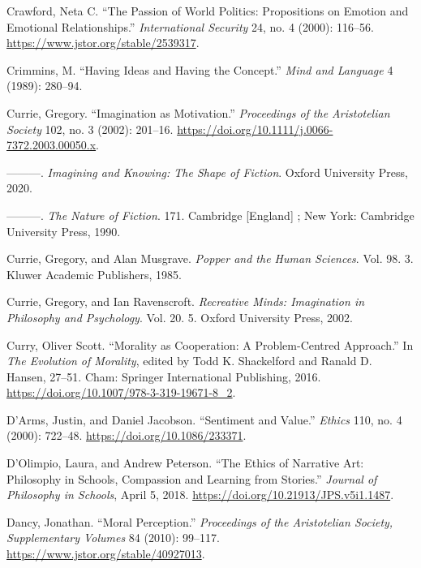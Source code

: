 \documentclass[phdthesis,12pt,final]{wuthesis}
\newlength{\cslhangindent}
\newenvironment{CSLReferences}[2] %
{\begin{list}{}{%
	\setlength{\itemindent}{0pt}
	\setlength{\leftmargin}{0pt}
	\setlength{\parsep}{0pt}
	\ifodd #1
	\setlength{\leftmargin}{\cslhangindent}
	\setlength{\itemindent}{-1\cslhangindent}
	\fi
	\setlength{\itemsep}{#2\baselineskip}}}
{\end{list}}
\theoremstyle{definition}
\theoremstyle{definition}
\theoremstyle{definition}
\theoremstyle{definition}
\theoremstyle{remark}
\begin{document}
\begin{CSLReferences}{1}{0}
Crawford, Neta C. {``The Passion of World Politics: Propositions on Emotion and Emotional Relationships.''} \emph{International Security} 24, no. 4 (2000): 116--56. \url{https://www.jstor.org/stable/2539317}.

Crimmins, M. {``Having Ideas and Having the Concept.''} \emph{Mind and Language} 4 (1989): 280--94.

Currie, Gregory. {``Imagination as Motivation.''} \emph{Proceedings of the Aristotelian Society} 102, no. 3 (2002): 201--16. \url{https://doi.org/10.1111/j.0066-7372.2003.00050.x}.

---------. \emph{Imagining and Knowing: The Shape of Fiction}. Oxford University Press, 2020.

---------. \emph{The Nature of Fiction}. 171. Cambridge {[}England{]} ; New York: Cambridge University Press, 1990.

Currie, Gregory, and Alan Musgrave. \emph{Popper and the Human Sciences}. Vol. 98. 3. Kluwer Academic Publishers, 1985.

Currie, Gregory, and Ian Ravenscroft. \emph{Recreative Minds: Imagination in Philosophy and Psychology}. Vol. 20. 5. Oxford University Press, 2002.

Curry, Oliver Scott. {``Morality as {Cooperation}: {A Problem-Centred Approach}.''} In \emph{The {Evolution} of {Morality}}, edited by Todd K. Shackelford and Ranald D. Hansen, 27--51. Cham: Springer International Publishing, 2016. \url{https://doi.org/10.1007/978-3-319-19671-8_2}.

D'Arms, Justin, and Daniel Jacobson. {``Sentiment and {Value}.''} \emph{Ethics} 110, no. 4 (2000): 722--48. \url{https://doi.org/10.1086/233371}.

D'Olimpio, Laura, and Andrew Peterson. {``The Ethics of Narrative Art: Philosophy in Schools, Compassion and Learning from Stories.''} \emph{Journal of Philosophy in Schools}, April 5, 2018. \url{https://doi.org/10.21913/JPS.v5i1.1487}.

Dancy, Jonathan. {``Moral {Perception}.''} \emph{Proceedings of the Aristotelian Society, Supplementary Volumes} 84 (2010): 99--117. \url{https://www.jstor.org/stable/40927013}.


\end{CSLReferences}
\end{document}
